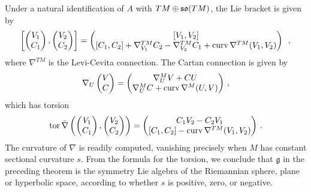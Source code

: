 \documentclass[leqno,12pt]{amsart} %
\begin{document}
\begin{example}
  Under a natural identification of $A$ with $ TM \oplus \mathfrak{so}(TM)$, the Lie bracket is
  given by
\begin{equation*}
  \left[
  \begin{pmatrix}
    V_1\\ C_1
  \end{pmatrix},
  \begin{pmatrix}
    V_2\\ C_2
  \end{pmatrix}
\right] =
\begin{pmatrix}
  [V_1,V_2]\\
  [C_1, C_2] + \nabla^{TM}_{V_1} C_2 - \nabla^{TM}_{V_2}
  C_1 + \operatorname{curv} \nabla^{TM}(V_1,V_2)
\end{pmatrix}\enspace,
\end{equation*}
where $\nabla^{TM}$ is the Levi-Cevita connection. The Cartan connection is given by
\begin{equation*}
  \nabla_U
  \begin{pmatrix}
    V \\ C
  \end{pmatrix}
  =
  \begin{pmatrix}
    \nabla^M_UV + C U \\
    \nabla^M_UC + \operatorname{curv} \nabla^M (U,V)
  \end{pmatrix}\,,
\end{equation*}
which has torsion
\begin{equation}
  \operatorname{tor} \bar\nabla \left(
    \begin{pmatrix}
        V_1 \\ C_1
      \end{pmatrix},
      \begin{pmatrix}
        V_2 \\ C_2
      \end{pmatrix}
  \right)=
  \begin{pmatrix}
    C_1 V_2 -C_2 V_1 \\
    [C_1,C_2] - \operatorname{curv} \nabla^{TM} (V_1,V_2)
  \end{pmatrix}\,.  \label{torsion}
\end{equation}
The curvature of $\nabla $ is readily computed, vanishing precisely when $M$ has constant
sectional curvature $s$. From the formula for the torsion, we conclude that
${\mathfrak g} $ in the preceding theorem is the symmetry Lie algebra of the Riemannian
sphere, plane or hyperbolic space, according to whether $s$ is positive, zero, or
negative.
\end{example}
\end{document}
